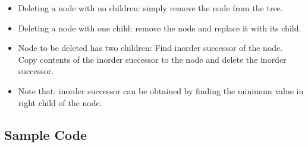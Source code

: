 \documentclass[12pt]{article}
\begin{document}
    \begin{itemize}
        \item Deleting a node with no children: simply remove the node from the tree.
        \item Deleting a node with one child: remove the node and replace it with its child.
        \item Node to be deleted has two children: Find inorder successor of the node. Copy contents of the inorder successor to the node and delete the inorder successor.
        \item Note that: inorder successor can be obtained by finding the minimum value in right child of the node.\cite{14}
    \end{itemize}
    
\subsection{Sample Code}
\end{document}
